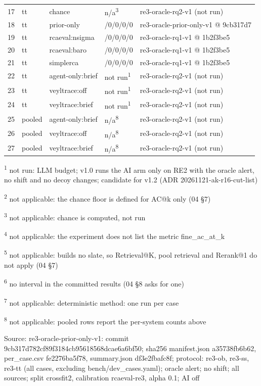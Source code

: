 \begin{longtable}{@{}r>{\raggedright\arraybackslash}p{18.0pt}>{\raggedright\arraybackslash}p{48.0pt}>{\raggedright\arraybackslash}p{30.0pt}>{\raggedright\arraybackslash}p{105.0pt}@{}}
17 & tt & chance & n/a\textsuperscript{3} & re3-oracle-rq2-v1 (not run) \\
18 & tt & prior-only & 30/0/0/0/0 & re3-oracle-prior-only-v1 @ 9cb317d7 \\
19 & tt & rcaeval:nsigma & 30/0/0/0/0 & re3-oracle-rq1-v1 @ 1b2f3be5 \\
20 & tt & rcaeval:baro & 30/0/0/0/0 & re3-oracle-rq1-v1 @ 1b2f3be5 \\
21 & tt & simplerca & 30/0/0/0/0 & re3-oracle-rq1-v1 @ 1b2f3be5 \\
22 & tt & agent-only:brief & not run\textsuperscript{1} & re3-oracle-rq2-v1 (not run) \\
23 & tt & veyltrace:off & not run\textsuperscript{1} & re3-oracle-rq2-v1 (not run) \\
24 & tt & veyltrace:brief & not run\textsuperscript{1} & re3-oracle-rq2-v1 (not run) \\
25 & pooled & agent-only:brief & n/a\textsuperscript{8} & re3-oracle-rq2-v1 (not run) \\
26 & pooled & veyltrace:off & n/a\textsuperscript{8} & re3-oracle-rq2-v1 (not run) \\
27 & pooled & veyltrace:brief & n/a\textsuperscript{8} & re3-oracle-rq2-v1 (not run) \\
\end{longtable}
\par\raggedright\noindent
\textsuperscript{1} not run: LLM budget; v1.0 runs the AI arm only on RE2 with the oracle alert, no shift and no decoy changes; candidate for v1.2 (ADR 20261121-ak-r16-cut-list)\par
\textsuperscript{2} not applicable: the chance floor is defined for AC@k only (04 \S{}7)\par
\textsuperscript{3} not applicable: chance is computed, not run\par
\textsuperscript{4} not applicable: the experiment does not list the metric fine\_ac\_at\_k\par
\textsuperscript{5} not applicable: builds no slate, so Retrieval@K, pool retrieval and Rerank@1 do not apply (04 \S{}7)\par
\textsuperscript{6} no interval in the committed results (04 \S{}8 asks for one)\par
\textsuperscript{7} not applicable: deterministic method: one run per case\par
\textsuperscript{8} not applicable: pooled rows report the per-system counts above\par
\noindent Source: re3-oracle-prior-only-v1: commit 9cb317d782cf89f3184cb95618568dcae6a6bf50; sha256 manifest.json a35738fb6b62, per\_case.csv fe2276ba5f78, summary.json df3e2fbafc8f; protocol: re3-ob, re3-ss, re3-tt (all cases, excluding bench/\allowbreak{}dev\_cases.yaml); oracle alert; no shift; all sources; split crossfit2, calibration rcaeval-re3, alpha 0.1; AI off\par
